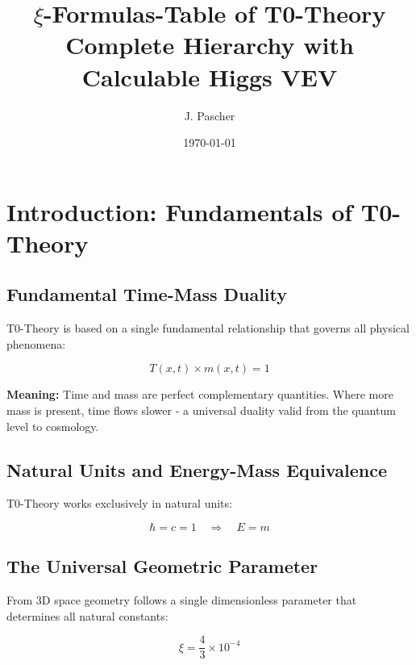 \documentclass[12pt,a4paper]{article}
\begin{document}
	
	\title{\textbf{\(\xi\)-Formulas-Table of T0-Theory}\\
		\small Complete Hierarchy with Calculable Higgs VEV}
	
	\author{J. Pascher}
	\date{\today}
	
	\maketitle
	
	\section{Introduction: Fundamentals of T0-Theory}
	
	\subsection{Fundamental Time-Mass Duality}
	
	T0-Theory is based on a single fundamental relationship that governs all physical phenomena:
	
	\begin{equation}
		\boxed{T(x,t) \times m(x,t) = 1}
	\end{equation}
	
	\textbf{Meaning:} Time and mass are perfect complementary quantities. Where more mass is present, time flows slower - a universal duality valid from the quantum level to cosmology.
	
	\subsection{Natural Units and Energy-Mass Equivalence}
	
	T0-Theory works exclusively in natural units:
	
	\begin{equation}
		\boxed{\hbar = c = 1 \quad \Rightarrow \quad E = m}
	\end{equation}
	
	\subsection{The Universal Geometric Parameter}
	
	From 3D space geometry follows a single dimensionless parameter that determines all natural constants:
	
	\begin{equation}
		\boxed{\xi = \frac{4}{3} \times 10^{-4}}
	\end{equation}
	
\end{document}
